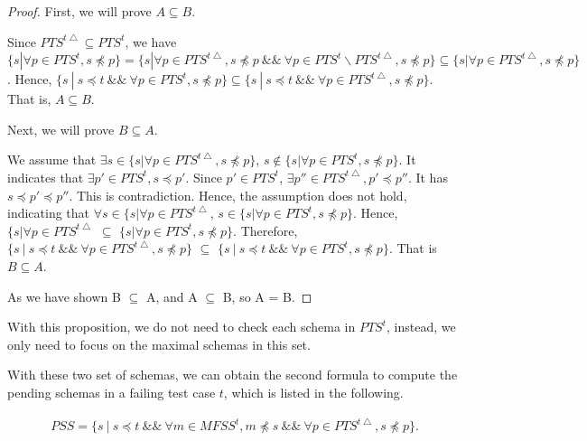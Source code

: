 \begin{proof}

First, we will prove $A \subseteq B$.

Since $PTS^{t\bigtriangleup} \subseteq PTS^{t}$, we have $  \{ s | \forall p \in PTS^{t}, s \npreceq p \} =  \{ s | \forall p \in PTS^{t\bigtriangleup}, s \npreceq p \ \&\& \  \forall p \in PTS^{t} \backslash PTS^{t\bigtriangleup}, s \npreceq p \} \subseteq \{ s | \forall p \in PTS^{t\bigtriangleup}, s \npreceq p \}$. Hence,  $\{ s\ |\ s \preceq t\ \&\&\ \forall p \in PTS^{t}, s \npreceq p \} \subseteq  \{ s\ |\ s \preceq t\ \&\&\ \forall p \in PTS^{t\bigtriangleup}, s \npreceq p \}$. That is,  $A \subseteq B$.

Next, we will prove $B \subseteq A$.

We assume that  $\exists s \in  \{ s | \forall p \in PTS^{t\bigtriangleup}, s \npreceq p \}$, $ s \notin \{ s | \forall p \in PTS^{t}, s \npreceq p \}$. It indicates that $\exists p' \in PTS^{t}, s \preceq p'$. Since $p' \in PTS^{t}$, $\exists p'' \in PTS^{t\bigtriangleup}, p' \preceq p''$. It has $s \preceq p' \preceq p''$. This is contradiction.  Hence, the assumption does not hold, indicating that $\forall s \in  \{ s | \forall p \in PTS^{t\bigtriangleup}$, $s \in  \{ s | \forall p \in PTS^{t}, s \npreceq p \}$. Hence, $\{ s | \forall p \in PTS^{t\bigtriangleup}$ $\subseteq$ $\{ s | \forall p \in PTS^{t}, s \npreceq p \}$. Therefore, $\{ s\ |\ s \preceq t\ \&\&\ \forall p \in PTS^{t\bigtriangleup}, s \npreceq p \}$ $\subseteq$ $\{ s\ |\ s \preceq t\ \&\&\ \forall p \in PTS^{t}, s \npreceq p \} $. That is $B \subseteq A$.

As we have shown B $\subseteq$ A, and A $\subseteq$ B, so A = B.
\end{proof}

With this proposition, we do not need to check each schema in $PTS^{t}$, instead, we only need to focus on the maximal schemas in this set.

With these two set of schemas, we can obtain the second formula to compute the pending schemas in a failing test case $t$, which is listed in the following.

\begin{equation}
\begin{aligned}\label{eq:pssfirst_mutated}
PSS=\{ s\ |\ s \preceq t\ \&\&\ \forall m \in MFSS^{t},  m \npreceq s  \ \&\&\  \forall p \in PTS^{t\bigtriangleup}, s \npreceq p \} .
\end{aligned}
\end{equation}

